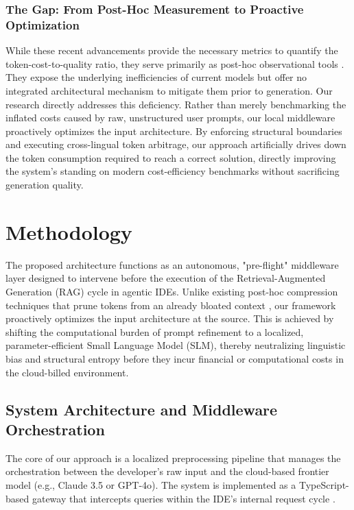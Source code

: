 \documentclass[11pt,a4paper,twocolumn]{article}
\begin{document}
\subsubsection*{The Gap: From Post-Hoc Measurement to Proactive Optimization}

While these recent advancements provide the necessary metrics to quantify the token-cost-to-quality ratio, they serve primarily as post-hoc observational tools \cite{du2026ockbench, peng2025coffe}. They expose the underlying inefficiencies of current models but offer no integrated architectural mechanism to mitigate them prior to generation. Our research directly addresses this deficiency. Rather than merely benchmarking the inflated costs caused by raw, unstructured user prompts, our local middleware proactively optimizes the input architecture. By enforcing structural boundaries and executing cross-lingual token arbitrage, our approach artificially drives down the token consumption required to reach a correct solution, directly improving the system's standing on modern cost-efficiency benchmarks without sacrificing generation quality.

\section{Methodology}
\label{sec:methodology}
The proposed architecture functions as an autonomous, "pre-flight" middleware layer designed to intervene before the execution of the Retrieval-Augmented Generation (RAG) cycle in agentic IDEs. Unlike existing post-hoc compression techniques that prune tokens from an already bloated context \cite{jiang2023llmlingua}, our framework proactively optimizes the input architecture at the source. This is achieved by shifting the computational burden of prompt refinement to a localized, parameter-efficient Small Language Model (SLM), thereby neutralizing linguistic bias and structural entropy before they incur financial or computational costs in the cloud-billed environment.

\subsection{System Architecture and Middleware Orchestration}
The core of our approach is a localized preprocessing pipeline that manages the orchestration between the developer's raw input and the cloud-based frontier model (e.g., Claude 3.5 or GPT-4o). The system is implemented as a TypeScript-based gateway that intercepts queries within the IDE's internal request cycle \cite{peng2025coffe}. 
\end{document}
